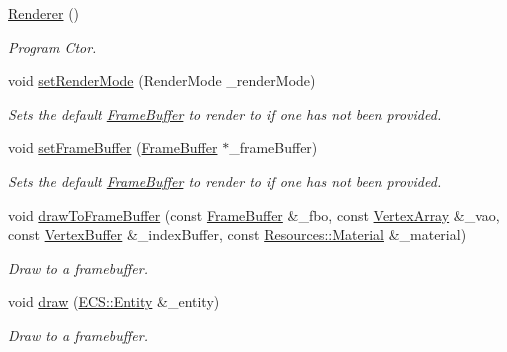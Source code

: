 \begin{DoxyCompactItemize}
\item 
\hyperlink{class_cookie_eng_1_1_graphics_1_1_renderer_a255e78964e0d0ff7efd26e60a6612f39}{Renderer} ()
\begin{DoxyCompactList}\small\item\em Program Ctor. \end{DoxyCompactList}\item 
void \hyperlink{class_cookie_eng_1_1_graphics_1_1_renderer_afd0601318ff6155fbaa9af6a16cff079}{set\+Render\+Mode} (Render\+Mode \+\_\+render\+Mode)
\begin{DoxyCompactList}\small\item\em Sets the default \hyperlink{class_cookie_eng_1_1_graphics_1_1_frame_buffer}{Frame\+Buffer} to render to if one has not been provided. \end{DoxyCompactList}\item 
void \hyperlink{class_cookie_eng_1_1_graphics_1_1_renderer_a9e8bce3cb731b1f09ca5bc4bc863414b}{set\+Frame\+Buffer} (\hyperlink{class_cookie_eng_1_1_graphics_1_1_frame_buffer}{Frame\+Buffer} $\ast$\+\_\+frame\+Buffer)
\begin{DoxyCompactList}\small\item\em Sets the default \hyperlink{class_cookie_eng_1_1_graphics_1_1_frame_buffer}{Frame\+Buffer} to render to if one has not been provided. \end{DoxyCompactList}\item 
void \hyperlink{class_cookie_eng_1_1_graphics_1_1_renderer_aa32e62971f191a434ab457f9ac84ac31}{draw\+To\+Frame\+Buffer} (const \hyperlink{class_cookie_eng_1_1_graphics_1_1_frame_buffer}{Frame\+Buffer} \&\+\_\+fbo, const \hyperlink{class_cookie_eng_1_1_graphics_1_1_vertex_array}{Vertex\+Array} \&\+\_\+vao, const \hyperlink{class_cookie_eng_1_1_graphics_1_1_vertex_buffer}{Vertex\+Buffer} \&\+\_\+index\+Buffer, const \hyperlink{class_cookie_eng_1_1_resources_1_1_material}{Resources\+::\+Material} \&\+\_\+material)
\begin{DoxyCompactList}\small\item\em Draw to a framebuffer. \end{DoxyCompactList}\item 
void \hyperlink{class_cookie_eng_1_1_graphics_1_1_renderer_a5cadfbd80259f0188e52880c47ac7573}{draw} (\hyperlink{class_cookie_eng_1_1_e_c_s_1_1_entity}{E\+C\+S\+::\+Entity} \&\+\_\+entity)
\begin{DoxyCompactList}\small\item\em Draw to a framebuffer. \end{DoxyCompactList}\end{DoxyCompactItemize}
